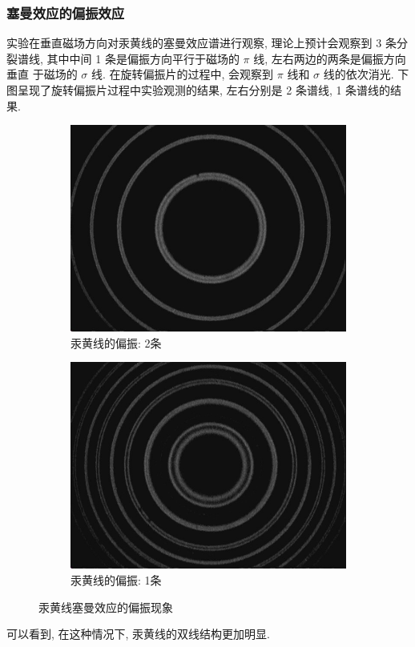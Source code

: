 \documentclass[12pt,a4paper]{article}
\begin{document}
\subsubsection{塞曼效应的偏振效应}
实验在垂直磁场方向对汞黄线的塞曼效应谱进行观察, 理论上预计会观察到 3 条分
裂谱线, 其中中间 1 条是偏振方向平行于磁场的 $\pi$ 线, 左右两边的两条是偏振方向垂直
于磁场的 $\sigma$ 线. 在旋转偏振片的过程中, 会观察到 $\pi$ 线和 $\sigma$ 线的依次消光.
下图呈现了旋转偏振片过程中实验观测的结果, 左右分别是 2 条谱线, 1 条谱线的结果.
\begin{figure}[H]
    \centering
    \begin{subfigure}[b]{0.45\textwidth}
      \centering
      \includegraphics[width=\textwidth]{Multirings@2.55A_polorizedA.jpg}
      \caption{汞黄线的偏振: 2条}
    \end{subfigure}
    \hfill
    \begin{subfigure}[b]{0.45\textwidth}
      \centering
      \includegraphics[width=\textwidth]{Multirings@2.55A_polorizedB.jpg}
      \caption{汞黄线的偏振: 1条}
    \end{subfigure}
  \caption{汞黄线塞曼效应的偏振现象}
  \end{figure}
可以看到, 在这种情况下, 汞黄线的双线结构更加明显. 
\end{document}
